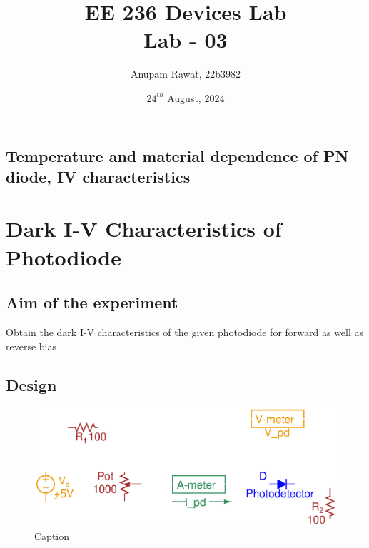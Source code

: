 \documentclass[a4paper]{article}
\title{EE 236 Devices Lab \\ Lab - 03}
\author{Anupam Rawat, 22b3982}
\date{${24^{th}}$ August, 2024}
\begin{document}
\maketitle
\begin{center}
    \section*{Temperature and material dependence of PN diode, IV characteristics}    
\end{center}


\section{Dark I-V Characteristics of Photodiode}

\subsection{Aim of the experiment}
Obtain the dark I-V characteristics of the given photodiode for forward as
well as reverse bias

\subsection{Design}
\begin{figure}[h!]
    \centering
    \includegraphics{Lab_3_Circuit_Design_Exp_1.eps}
    \caption{Caption}
    \label{fig:enter-label}
\end{figure}

\newpage
\end{document}
